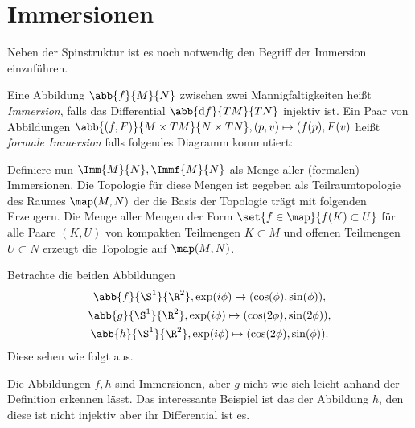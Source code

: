 



\section{Immersionen}

Neben der Spinstruktur ist es noch notwendig den Begriff der Immersion 
einzuführen.

\begin{Def}
	Eine Abbildung $\abb{f}{M}{N}$ zwischen zwei Mannigfaltigkeiten
	heißt \textit{Immersion}, falls das Differential $\abb{\mathrm{d} f}{TM}{TN}$ 
	injektiv ist.
	Ein Paar von Abbildungen $\abb{(f,F)}{M \times TM}{N \times TN} ,%
	(p,v) \mapsto (f(p),F(v)$ heißt \textit{formale Immersion} falls folgendes
	Diagramm kommutiert:
	\begin{center}
		
		
	\end{center}
	
	Definiere nun $\Imm{M}{N},\Immf{M}{N}$ als Menge aller (formalen) Immersionen. Die Topologie für diese Mengen ist gegeben als Teilraumtopologie des Raumes $\map(M,N)$ der die Basis der Topologie 
	trägt mit folgenden Erzeugern. Die Menge aller Mengen der Form $\set{f \in \map}{ f(K) \subset U}$
	für alle Paare $(K,U)$ von kompakten Teilmengen $K \subset M$ und
	offenen Teilmengen $U \subset N$ erzeugt die Topologie auf $\map(M,N)$.
\end{Def}


\begin{Bsp}
	Betrachte die beiden Abbildungen 
	\begin{gather*}
		\abb{f}{\S^1}{\R^2}, \exp(i\phi)%
		\mapsto (\cos(\phi),\sin(\phi)),\\
		\abb{g}{\S^1}{\R^2}, \exp(i\phi)%
		\mapsto (\cos(2\phi),\sin(2\phi)),\\
		\abb{h}{\S^1}{\R^2}, \exp(i\phi)%
		\mapsto (\cos(2\phi),\sin(\phi)).
	\end{gather*}
	Diese sehen wie folgt aus.\\
	
	Die Abbildungen $f,h$ sind Immersionen, aber $g$ nicht wie sich leicht
	anhand der Definition erkennen lässt. Das interessante Beispiel ist
	das der Abbildung $h$, den diese ist nicht injektiv aber ihr Differential
	ist es.
\end{Bsp}


